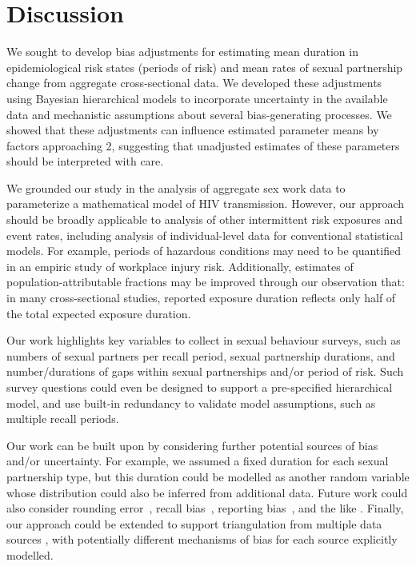 \section{Discussion}
We sought to develop bias adjustments for estimating
mean duration in epidemiological risk states (periods of risk) and
mean rates of sexual partnership change
from aggregate cross-sectional data.
We developed these adjustments using Bayesian hierarchical models to incorporate
uncertainty in the available data and
mechanistic assumptions about several bias-generating processes.
We showed that these adjustments can influence
estimated parameter means by factors approaching 2,
suggesting that unadjusted estimates of these parameters
should be interpreted with care.
\par
We grounded our study in the analysis of aggregate sex work data
to parameterize a mathematical model of HIV transmission.
However, our approach should be broadly applicable to
analysis of other intermittent risk exposures and event rates,
including analysis of individual-level data for conventional statistical models.
For example, periods of hazardous conditions may need to be quantified
in an empiric study of workplace injury risk.
Additionally, estimates of population-attributable fractions
may be improved through our observation that: in many cross-sectional studies,
reported exposure duration reflects only half of the total expected exposure duration.
\par
Our work highlights key variables to collect in sexual behaviour surveys, such as
numbers of sexual partners per recall period,
sexual partnership durations, and
number/durations of gaps within sexual partnerships and/or period of risk.
Such survey questions could even be designed to support
a pre-specified hierarchical model,
and use built-in redundancy to validate model assumptions,
such as multiple recall periods.
\par
Our work can be built upon by considering
further potential sources of bias and/or uncertainty.
For example, we assumed a fixed duration for each sexual partnership type,
but this duration could be modelled as another random variable
whose distribution could also be inferred from additional data.
Future work could also consider
rounding error~\cite{Mills2014},
recall bias~\cite{Ramjee1999},
reporting bias~\cite{Lowndes2012},
and the like \cite{Fenton2001}.
Finally, our approach could be extended to support
triangulation from multiple data sources \cite{Lawlor2016},
with potentially different mechanisms of bias for each source explicitly modelled.
